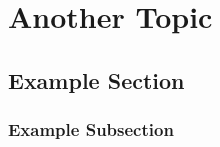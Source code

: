 \chapter{Another Topic}

\blindtext

\blindtext

\section{Example Section}

\blindtext
\blindtext

\subsection{Example Subsection}

\blindtext

\blindtext
